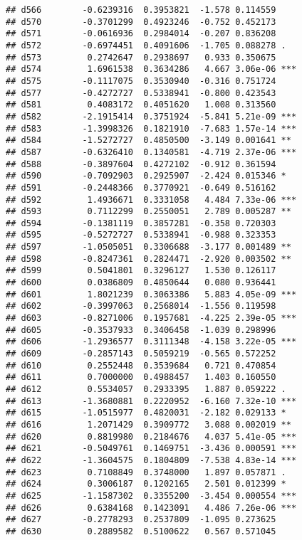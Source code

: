 \documentclass[
]{article}
\begin{document}
\begin{verbatim}
## d566        -0.6239316  0.3953821  -1.578 0.114559    
## d570        -0.3701299  0.4923246  -0.752 0.452173    
## d571        -0.0616936  0.2984014  -0.207 0.836208    
## d572        -0.6974451  0.4091606  -1.705 0.088278 .  
## d573         0.2742647  0.2938697   0.933 0.350675    
## d574         1.6961538  0.3634286   4.667 3.06e-06 ***
## d575        -0.1117075  0.3530940  -0.316 0.751724    
## d577        -0.4272727  0.5338941  -0.800 0.423543    
## d581         0.4083172  0.4051620   1.008 0.313560    
## d582        -2.1915414  0.3751924  -5.841 5.21e-09 ***
## d583        -1.3998326  0.1821910  -7.683 1.57e-14 ***
## d584        -1.5272727  0.4850500  -3.149 0.001641 ** 
## d587        -0.6326410  0.1340581  -4.719 2.37e-06 ***
## d588        -0.3897604  0.4272102  -0.912 0.361594    
## d590        -0.7092903  0.2925907  -2.424 0.015346 *  
## d591        -0.2448366  0.3770921  -0.649 0.516162    
## d592         1.4936671  0.3331058   4.484 7.33e-06 ***
## d593         0.7112299  0.2550051   2.789 0.005287 ** 
## d594        -0.1381119  0.3857281  -0.358 0.720303    
## d595        -0.5272727  0.5338941  -0.988 0.323353    
## d597        -1.0505051  0.3306688  -3.177 0.001489 ** 
## d598        -0.8247361  0.2824471  -2.920 0.003502 ** 
## d599         0.5041801  0.3296127   1.530 0.126117    
## d600         0.0386809  0.4850644   0.080 0.936441    
## d601         1.8021239  0.3063386   5.883 4.05e-09 ***
## d602        -0.3997063  0.2568014  -1.556 0.119598    
## d603        -0.8271006  0.1957681  -4.225 2.39e-05 ***
## d605        -0.3537933  0.3406458  -1.039 0.298996    
## d606        -1.2936577  0.3111348  -4.158 3.22e-05 ***
## d609        -0.2857143  0.5059219  -0.565 0.572252    
## d610         0.2552448  0.3539684   0.721 0.470854    
## d611         0.7000000  0.4988457   1.403 0.160550    
## d612         0.5534057  0.2933395   1.887 0.059222 .  
## d613        -1.3680881  0.2220952  -6.160 7.32e-10 ***
## d615        -1.0515977  0.4820031  -2.182 0.029133 *  
## d616         1.2071429  0.3909772   3.088 0.002019 ** 
## d620         0.8819980  0.2184676   4.037 5.41e-05 ***
## d621        -0.5049761  0.1469751  -3.436 0.000591 ***
## d622        -1.3604575  0.1804809  -7.538 4.83e-14 ***
## d623         0.7108849  0.3748000   1.897 0.057871 .  
## d624         0.3006187  0.1202165   2.501 0.012399 *  
## d625        -1.1587302  0.3355200  -3.454 0.000554 ***
## d626         0.6384168  0.1423091   4.486 7.26e-06 ***
## d627        -0.2778293  0.2537809  -1.095 0.273625    
## d630         0.2889582  0.5100622   0.567 0.571045    

\end{verbatim}
\end{document}
